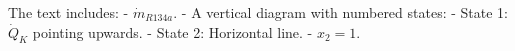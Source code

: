 The text includes:  
- \( \dot{m}_{R134a} \).  
- A vertical diagram with numbered states:  
  - State 1: \( \dot{Q}_K \) pointing upwards.  
  - State 2: Horizontal line.  
- \( x_2 = 1 \).